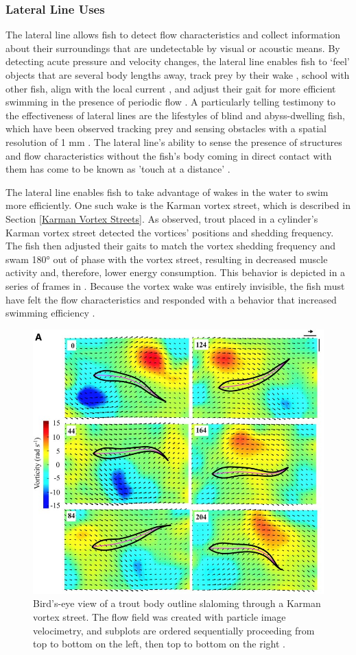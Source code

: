 \subsubsection{Lateral Line Uses} \label{Lateral Line Uses}

	The lateral line allows fish to detect flow characteristics and collect information about their surroundings that are undetectable by visual or acoustic means. By detecting acute pressure and velocity changes, the lateral line enables fish to ‘feel’ objects that are several body lengths away, track prey by their wake \citep{Montgomery1995}, school with other fish, align with the local current \citep{Montgomery1999}, and adjust their gait for more efficient swimming in the presence of periodic flow \citep{Liao2003}. A particularly telling testimony to the effectiveness of lateral lines are the lifestyles of blind \citep{Windsor2010} and abyss-dwelling fish, which have been observed tracking prey and sensing obstacles with a spatial resolution of 1 mm \citep{Hassan1986}. The lateral line's ability to sense the presence of structures and flow characteristics without the fish's body coming in direct contact with them has come to be known as 'touch at a distance' \citep{Dijkgraaf1962}. 
	
	The lateral line enables fish to take advantage of wakes in the water to swim more efficiently. One such wake is the Karman vortex street, which is described in Section \ref{Karman Vortex Streets}. As \citep{Liao2003} observed, trout placed in a cylinder’s Karman vortex street detected the vortices’ positions and shedding frequency. The fish then adjusted their gaits to match the vortex shedding frequency and swam 180° out of phase with the vortex street, resulting in decreased muscle activity and, therefore, lower energy consumption. This behavior is depicted in a series of frames in . Because the vortex wake was entirely invisible, the fish must have felt the flow characteristics and responded with a behavior that increased swimming efficiency \citep{Liao2003}.

\begin{figure}
\begin{center}
\includegraphics[width=0.49\columnwidth]{figures/Liao Slalom.jpg}
\end{center}
\caption{Bird's-eye view of a trout body outline slaloming through a Karman vortex street. The flow field was created with particle image velocimetry, and subplots are ordered sequentially proceeding from top to bottom on the left, then top to bottom on the right \citep{Liao2003}.}
\label{fig:app:Slalom}
\end{figure}

